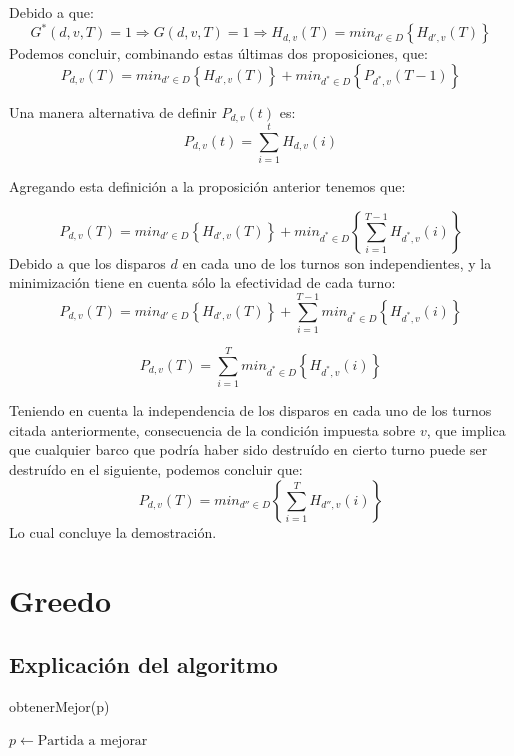 \documentclass{article}
\begin{document}
Debido a que: $$G^*(d,v,T)=1 \Rightarrow G(d,v,T)=1 \Rightarrow H_{d,v}(T)=min_{d' \in D} \left \{ H_{d',v}(T) \right \}$$
Podemos concluir, combinando estas últimas dos proposiciones, que:
$$P_{d,v}(T)=min_{d' \in D} \left \{ H_{d',v}(T) \right \}+min_{d^* \in D}\left \{ P_{d^*,v}(T-1) \right \}$$

Una manera alternativa de definir $P_{d,v}(t)$ es:$$P_{d,v}(t)=\sum_{i=1}^{t} H_{d,v}(i)$$

Agregando esta definición a la proposición anterior tenemos que:

$$P_{d,v}(T)=min_{d' \in D} \left \{ H_{d',v}(T) \right \}+min_{d^* \in D}\left \{ \sum_{i=1}^{T-1} H_{d^*,v}(i) \right \}$$
Debido a que los disparos $d$ en cada uno de los turnos son independientes, y la minimización tiene en cuenta sólo la efectividad de cada turno:
$$P_{d,v}(T)=min_{d' \in D} \left \{ H_{d',v}(T) \right \}+\sum_{i=1}^{T-1} min_{d^* \in D}\left \{  H_{d^*,v}(i) \right \}$$

$$P_{d,v}(T)=\sum_{i=1}^{T} min_{d^* \in D}\left \{  H_{d^*,v}(i) \right \}$$

Teniendo en cuenta la independencia de los disparos en cada uno de los turnos citada anteriormente, consecuencia de la condición impuesta sobre $v$, que implica que cualquier barco que podría haber sido destruído en cierto turno puede ser destruído en el siguiente, podemos concluir que:
$$P_{d,v}(T)=min_{d'' \in D}\left \{ \sum_{i=1}^{T} H_{d'',v}(i) \right \}$$
Lo cual concluye la demostración.

\section{Greedo}

\subsection{Explicación del algoritmo}

\begin{algorithm}
\caption{obtenerMejor(p)}
    $p \leftarrow \text{Partida a mejorar}$ \\
\end{algorithm}
\end{document}
